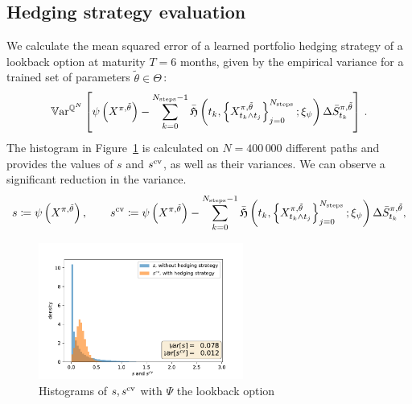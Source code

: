 \subsection{Hedging strategy evaluation}
We calculate the mean squared error of a learned portfolio hedging strategy of a lookback option at maturity $T=6$ months, given by the empirical variance for a trained set of parameters $\tilde{\theta}\in\Theta\,$:
\[
\mathbb{V}\mathrm{ar}^{\mathbb{Q}^N} \left[ \psi\left(X^{\pi,\tilde{\theta}}\right)-\sum_{k=0}^{N_{\text{steps}}-1} \bar{\mathfrak{H}}\left(t_k, \left\{X_{t_k\wedge t_j}^{\pi,\tilde{\theta}}\right\}_{j=0}^{N_{\text{steps}}}; \xi_{\psi}\right)\Delta \bar S^{\pi,\tilde{\theta}}_{t_{k}} \right] \,.
\]
The histogram in Figure~\ref{fig: SPX eval hedging strategy} is calculated on $N=400\, 000$ different paths and provides the values of $s$ and $s^{\textup{cv}}$, as well as their variances. We can observe a significant reduction in the variance. 
\[
s\coloneqq\psi\left(X^{\pi,\tilde{\theta}}\right), \qquad
s^{\textup{cv}}\coloneqq \psi\left(X^{\pi,\tilde{\theta}}\right)-\sum_{k=0}^{N_{\text{steps}}-1} \bar{\mathfrak{H}}\left(t_k, \left\{X_{t_k\wedge t_j}^{\pi,\tilde{\theta}}\right\}_{j=0}^{N_{\text{steps}}}; \xi_{\psi}\right)\Delta \bar S^{\pi,\tilde{\theta}}_{t_{k}},
\]

\begin{figure}[H]\label{fig hedge error}
\centering
\includegraphics[clip,width=0.6\textwidth]{content/reschap1/Figures/figures_SPX/eval_hedging.pdf}
\caption{Histograms of $s, s^{\textup{cv}}$ with $\Psi$ the lookback option}	
\label{fig: SPX eval hedging strategy}

\end{figure}

